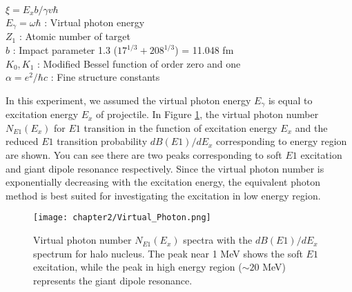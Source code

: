 \begin{adjustwidth}{1cm}{1cm}
    $\xi = E_x b / \gamma v \hbar$ \\
    $E_{\gamma} = \omega \hbar$ : Virtual photon energy\\ 
    $Z_{1}$ : Atomic number of target\\
    $b$ : Impact parameter 1.3 ($17^{1/3} + 208^{1/3}$) = 11.048 fm\\
    $K_0, K_1$ : Modified Bessel function of order zero and one \\
    $\alpha = e^2 / \hbar c$ : Fine structure constants\\
\end{adjustwidth}
In this experiment, we assumed the virtual photon energy $E_{\gamma}$ is equal to excitation energy $E_x$ of projectile. In Figure \ref{fig:Virtual_Photon}, the virtual photon number $N_{E1}(E_x)$ for $E1$ transition in the function of excitation energy $E_x$ and the reduced $E1$ transition probability $dB(E1)/dE_x$ corresponding to energy region are shown. You can see there are two peaks corresponding to soft $E1$ excitation and giant dipole resonance respectively. Since the virtual photon number is exponentially decreasing with the excitation energy, the equivalent photon method is best suited for investigating the excitation in low energy region. 

\begin{figure}[t]
    \centering
    \texttt{[image: chapter2/Virtual\_Photon.png]}
    \caption[Virtual photon number $N_{E1}(E_x)$ spectra and $dB(E1)/dE_x$ spectrum for halo nucleus\cite{Nakamura23}]{Virtual photon number $N_{E1}(E_x)$ spectra with the $dB(E1)/dE_x$ spectrum for halo nucleus\cite{Nakamura23}. The peak near 1 MeV shows the soft $E1$ excitation, while the peak in high energy region ($\sim 20$ MeV) represents the giant dipole resonance.}
    \label{fig:Virtual_Photon}
\end{figure}

